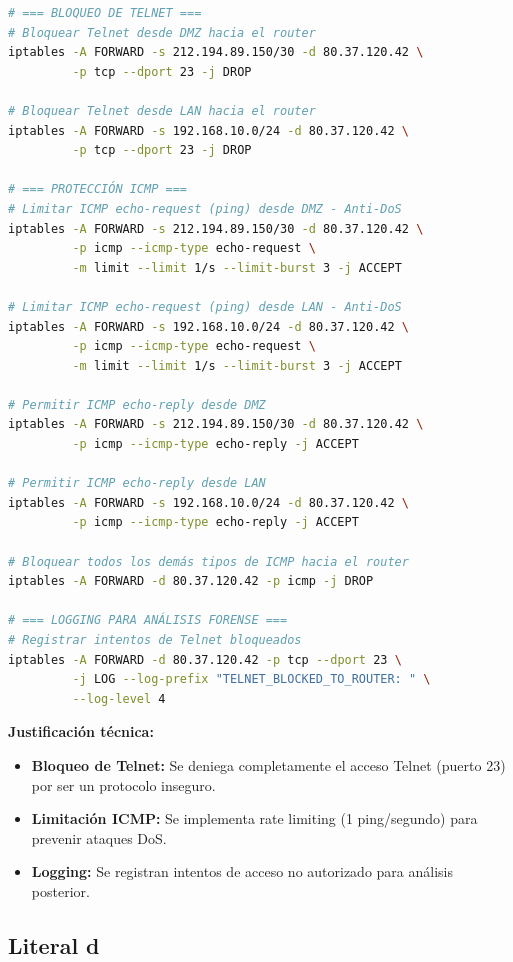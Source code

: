 {\begin{lstlisting}[language=bash, caption=Reglas de protección del router]
# === BLOQUEO DE TELNET ===
# Bloquear Telnet desde DMZ hacia el router
iptables -A FORWARD -s 212.194.89.150/30 -d 80.37.120.42 \
         -p tcp --dport 23 -j DROP

# Bloquear Telnet desde LAN hacia el router
iptables -A FORWARD -s 192.168.10.0/24 -d 80.37.120.42 \
         -p tcp --dport 23 -j DROP

# === PROTECCIÓN ICMP ===
# Limitar ICMP echo-request (ping) desde DMZ - Anti-DoS
iptables -A FORWARD -s 212.194.89.150/30 -d 80.37.120.42 \
         -p icmp --icmp-type echo-request \
         -m limit --limit 1/s --limit-burst 3 -j ACCEPT

# Limitar ICMP echo-request (ping) desde LAN - Anti-DoS
iptables -A FORWARD -s 192.168.10.0/24 -d 80.37.120.42 \
         -p icmp --icmp-type echo-request \
         -m limit --limit 1/s --limit-burst 3 -j ACCEPT

# Permitir ICMP echo-reply desde DMZ
iptables -A FORWARD -s 212.194.89.150/30 -d 80.37.120.42 \
         -p icmp --icmp-type echo-reply -j ACCEPT

# Permitir ICMP echo-reply desde LAN
iptables -A FORWARD -s 192.168.10.0/24 -d 80.37.120.42 \
         -p icmp --icmp-type echo-reply -j ACCEPT

# Bloquear todos los demás tipos de ICMP hacia el router
iptables -A FORWARD -d 80.37.120.42 -p icmp -j DROP

# === LOGGING PARA ANÁLISIS FORENSE ===
# Registrar intentos de Telnet bloqueados
iptables -A FORWARD -d 80.37.120.42 -p tcp --dport 23 \
         -j LOG --log-prefix "TELNET_BLOCKED_TO_ROUTER: " \
         --log-level 4
\end{lstlisting}

\textbf{Justificación técnica:}
\begin{itemize}
    \item \textbf{Bloqueo de Telnet:} Se deniega completamente el acceso Telnet (puerto 23) por ser un protocolo inseguro.
    \item \textbf{Limitación ICMP:} Se implementa rate limiting (1 ping/segundo) para prevenir ataques DoS.
    \item \textbf{Logging:} Se registran intentos de acceso no autorizado para análisis posterior.
\end{itemize}



\subsection{Literal d}

}
